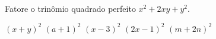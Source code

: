 Fatore o trinômio quadrado perfeito $x^2+2xy+y^2$.

$(x+y)^2$
$(a+1)^2$
$(x-3)^2$
$(2x-1)^2$
$(m+2n)^2$


